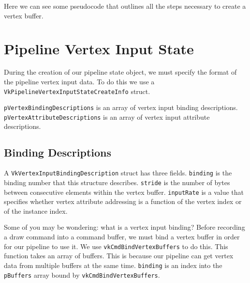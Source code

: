 Here we can see some pseudocode that outlines all the steps necessary to
create a vertex buffer.

\begin{minipage}{\linewidth}{\noindent}
    
\end{minipage}

\section{Pipeline Vertex Input State}

During the creation of our pipeline state object, we must specify
the format of the pipeline vertex input data.
To do this we use a \texttt{VkPipelineVertexInputStateCreateInfo} struct.

\begin{minipage}{\linewidth}{\noindent}
    
\end{minipage}

\texttt{pVertexBindingDescriptions} is an array of vertex input binding descriptions.
\texttt{pVertexAttributeDescriptions} is an array of vertex input attribute descriptions.

\subsection{Binding Descriptions}

A \texttt{VkVertexInputBindingDescription} struct has three fields.
\texttt{binding} is the binding number that this structure describes.
\texttt{stride} is the number of bytes between consecutive elements within the
vertex buffer.
\texttt{inputRate} is a value that specifies whether vertex attribute addressing
is a function of the vertex index or of the instance index.

Some of you may be wondering: what is a vertex input binding?
Before recording a draw command into a command buffer,
we must bind a vertex buffer in order for our pipeline to use it.
We use \texttt{vkCmdBindVertexBuffers} to do this.
This function takes an array of buffers.
This is because our pipeline can get vertex data from multiple buffers
at the same time.
\texttt{binding} is an index into the \texttt{pBuffers} array bound by
\texttt{vkCmdBindVertexBuffers}.

